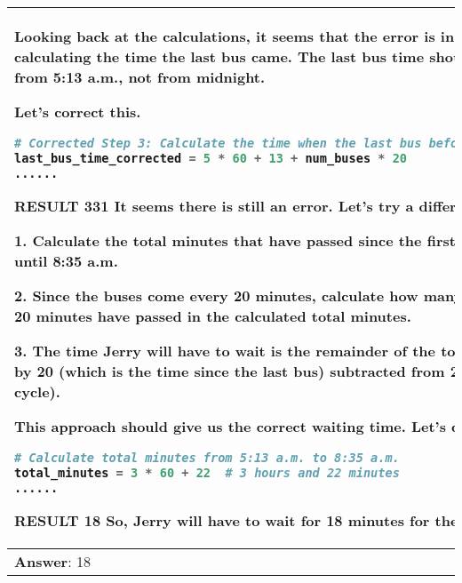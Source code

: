 \documentclass{article} \usepackage{iclr2023_conference,times}
\newcommand{\gptcode}{GPT4-Code}
\begin{document}
\begin{table*}[ht]
\begin{tabular}{p{}}
Looking back at the calculations, it seems that the error is in Step 3 when calculating the time the last bus came. The last bus time should be calculated from 5:13 a.m., not from midnight. 

Let's correct this.
\lstset{style=mystyle}
     \begin{lstlisting}[language=Python]
# Corrected Step 3: Calculate the time when the last bus before 8:35 a.m. came by.
last_bus_time_corrected = 5 * 60 + 13 + num_buses * 20
......
     \end{lstlisting} 
     \textbf{RESULT}\newline
    \textbf{331}\newline
It seems there is still an error. Let's try a different approach. 

1. Calculate the total minutes that have passed since the first bus at 5:13 a.m. until 8:35 a.m.

2. Since the buses come every 20 minutes, calculate how many complete cycles of 20 minutes have passed in the calculated total minutes.

3. The time Jerry will have to wait is the remainder of the total minutes divided by 20 (which is the time since the last bus) subtracted from 20 (which is the bus cycle).

This approach should give us the correct waiting time. Let's calculate it.
\lstset{style=mystyle}
     \begin{lstlisting}[language=Python]
# Calculate total minutes from 5:13 a.m. to 8:35 a.m.
total_minutes = 3 * 60 + 22  # 3 hours and 22 minutes
......
     \end{lstlisting} 
     \textbf{RESULT}\newline
    \textbf{18}\newline
    So, Jerry will have to wait for 18 minutes for the next bus. 

     \\
     \midrule

      \multicolumn{1}{p{0.90\textwidth}}{\small \textbf{Answer}:  18}
\\
     \bottomrule
    \end{tabular}
    \caption{An example in which \gptcode~adjusts its solution based on the result of code execution.}
    \label{tab:baseline_example2}
\end{table*}
\end{document}
